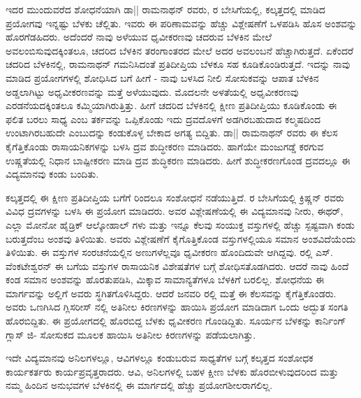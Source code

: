 ಇದರ ಮುಂದುವರೆದ ಶೋಧನೆಯಾಗಿ ಡಾ|| ರಾಮನಾಥನ್ ರವರು, ರ ಬೇಸಿಗೆಯಲ್ಲಿ, ಕಲ್ಕತ್ತದಲ್ಲಿ ಮಾಡಿದ ಪ್ರಯೋಗವು ಇನ್ನಷ್ಟು ಬೆಳಕು ಚೆಲ್ಲಿತು. ಇವರು ಈ ಪರಿಣಾಮವನ್ನು ಹೆಚ್ಚು ವಿಶ್ಲೇಷಣೆಗೆ ಒಳಪಡಿಸಿ ಹೊಸ ಅಂಶವನ್ನು ಹೊರಗೆಡಹಿದರು. ಅದೆಂದರೆ ನಾವು ಅಳೆಯುವ ಧೃವೀಕರಣವು ಚದರುವ ಬೆಳಕಿನ ಮೇಲೆ ಅವಲಂಬಿಸುವುದಕ್ಕಿಂತಲೂ, ಚದರಿದ ಬೆಳಕಿನ ತರಂಗಾಂತರದ ಮೇಲೆ ಅದರ ಅವಲಂಬನೆ ಹೆಚ್ಚಾಗಿರುತ್ತದೆ. ಏಕೆಂದರೆ ಚದರಿದ ಬೆಳಕಿನಲ್ಲಿ, ರಾಮನಾಥನ್ ಗಮನಿಸಿದಂತೆ ಪ್ರತಿದೀಪ್ತಿಯ ಬೆಳಕೂ ಸಹ ಕೂಡಿಕೊಂಡಿರುತ್ತದೆ. ಇದನ್ನು ನಾವು ಮಾಡಿದ ಪ್ರಯೋಗಗಳಲ್ಲಿ ಶೋಧಿಸಿದ ಬಗೆ ಹೀಗೆ - ನಾವು ಬಳಸಿದ ನೀಲಿ ಸೋಸುಕವನ್ನು ಆಪಾತ ಬೆಳಕಿನ ಅಡ್ಡಲಾಗಿಟ್ಟು ಅಧೃವೀಕರಣವನ್ನು ಮತ್ತೆ ಅಳೆಯುವುದು. ಮೊದಲನೇ ಅಳತೆಯಲ್ಲಿ ಅಧೃವೀಕರಣವು ಎರಡನೆಯದಕ್ಕಿಂತಲೂ ಕಮ್ಮಿಯಾಗಿರುತ್ತಿತ್ತು. ಹೀಗೆ ಚದರಿದ ಬೆಳಕಿನಲ್ಲಿ ಕ್ಷೀಣ ಪ್ರತಿದೀಪ್ತಿಯು ಕೂಡಿಕೊಂಡು ಈ ಫಲಿತ ಬರಲು ಸಾಧ್ಯ ಎಂಬ ತರ್ಕವನ್ನು ಒಪ್ಪಿಕೊಂಡು ಇದು ದ್ರವದೊಳಗೆ ಅಡಗಿರಬಹುದಾದ ಕಲ್ಮಷದಿಂದ ಉಂಟಾಗಿರಬಹುದೇ ಎಂಬುದನ್ನು ಕಂಡುಕೊಳ್ಳ ಬೇಕಾದ ಅಗತ್ಯ ಬಿದ್ದಿತು. ಡಾ|| ರಾಮನಾಥನ್ ರವರು ಈ ಕೆಲಸ ಕೈಗೆತ್ತಿಕೊಂಡು ರಾಸಾಯನಿಕಗಳನ್ನು ಬಳಸಿ ದ್ರವ ಶುದ್ಧೀಕರಣ ಮಾಡಿದರು. ಹಾಗೆಯೇ ಮಂಜುಗಡ್ಡೆ ಕರಗುವ ಉಷ್ಣತೆಯಲ್ಲಿ ನಿಧಾನ ಬಾಷ್ಪೀಕರಣ ಮಾಡಿ ದ್ರವ ಶುದ್ಧಿಕರಣ ಮಾಡಿದರು. ಹೀಗೆ ಶುದ್ಧೀಕರಣಗೊಂಡ ದ್ರವದಲ್ಲೂ ಈ ವಿದ್ಯಮಾನವು ಕಂಡು ಬಂದಿತು.

ಕಲ್ಕತ್ತದಲ್ಲಿ ಈ ಕ್ಷೀಣ ಪ್ರತಿದೀಪ್ತಿಯ ಬಗೆಗೆ  ರಿಂದಲೂ ಸಂಶೋಧನೆ ನಡೆಯುತ್ತಿದೆ. ರ ಬೇಸಿಗೆಯಲ್ಲಿ ಕ್ರಿಷ್ಣನ್ ರವರು  ವಿವಿಧ ದ್ರವಗಳನ್ನು ಬಳಸಿ ಈ ಪ್ರಯೋಗ ಮಾಡಿದರು. ಅವರ ವಿಶ್ಲೇಷಣೆಯಲ್ಲಿ ಈ ವಿದ್ಯಮಾನವು ನೀರು, ಈಥರ್, ಎಲ್ಲಾ ಮೋನೋ ಹೈಡ್ರಿಕ್ ಆಲ್ಕೋಹಾಲ್ ಗಳು ಮತ್ತು ಇನ್ನೂ ಕೆಲವು ಸಂಯುಕ್ತ ವಸ್ತುಗಳಲ್ಲಿ ಹೆಚ್ಚು ಸ್ಪಷ್ಟವಾಗಿ ಕಂಡು ಬರುತ್ತದೆಂಬ ಅಂಶವು ತಿಳಿಯಿತು. ಅವರು ವಿಶ್ಲೇಷಣೆಗೆ ಕೈಗೊತ್ತಿಕೊಂಡ ವಸ್ತುಗಳಲ್ಲಿಯೂ ಸಮಾನ ಅಂಶವಿದೆಯೆಂದು ತಿಳಿಯಿತು. ಈ ವಸ್ತುಗಳ ಸಂರಚನೆಯಲ್ಲಿನ ಅಣುಗಳೆಲ್ಲವೂ ಧೃವೀಕರಣ ಹೊಂದಿದುವೇ ಆಗಿದ್ದವು. ರಲ್ಲಿ ಎಸ್. ವೆಂಕಟೇಶ್ವರನ್ ಈ ಬಗೆಯ ವಸ್ತುಗಳ ರಾಸಾಯನಿಕ ವಿಶೇಷತೆಗಳ ಬಗ್ಗೆ ಶೋಧಿಸತೊಡಗಿದರು. ಆದರೆ ನಾವು ಹಿಂದೆ ಕಂಡ ಸಮಾನ ಅಂಶವನ್ನು ಹೊರತುಪಡಿಸಿ, ಮಿಕ್ಕಾವ ಸಾಮಾನ್ಯತೆಗಳೂ ಬೆಳಕಿಗೆ ಬರಲಿಲ್ಲ. ಶೋಧನೆಯ ಈ ಮಾರ್ಗವನ್ನು ಅಲ್ಲಿಗೆ ಅವರು ಸ್ಥಗಿತಗೊಳಿಸಿದ್ದರು. ಆದರೆ ಜನವರಿ ರಲ್ಲಿ ಮತ್ತೆ ಈ ಕೆಲಸವನ್ನು ಕೈಗೆತ್ತಿಕೊಂಡರು. ಅವರು ಒಣಗಿಸಿದ ಗ್ಲಿಸರೀಸ್ ನಲ್ಲಿ ಅತಿನೀಲ ಕಿರಣಗಳನ್ನು ಹಾಯಿಸಿ ಪ್ರಯೋಗ ಮಾಡಿದಾಗ ಒಂದು ಅದ್ಭುತ ಸಂಗತಿ ಹೊರಬಿದ್ದಿತು. ಈ ಪ್ರಯೋಗದಲ್ಲಿ ಹೊರಬಿದ್ದ ಬೆಳಕು ಧೃವೀಕರಣ ಗೊಂಡಿದ್ದಿತು. ಸೂರ್ಯನ ಬೆಳಕನ್ನು ಕಾರ್ನಿಂಗ್ ಗ್ಲಾಸ್ ಜಿ- ಸೋಸುಕದ ಮೂಲಕ ಹಾಯಿಸಿ ಅತಿನೀಲ ಕಿರಣಗಳನ್ನು ಪಡೆಯಲಾಗಿತ್ತು.

ಇದೇ ವಿದ್ಯಮಾನವು ಅನಿಲಗಳಲ್ಲೂ, ಆವಿಗಳಲ್ಲೂ ಕಂಡುಬರುವ ಸಾಧ್ಯತೆಗಳ ಬಗ್ಗೆ ಕಲ್ಕತ್ತದ ಸಂಶೋಧಕ ಕಾರ್ಯಕರ್ತರು ಕಾರ್ಯಪ್ರವೃತ್ತರಾದರು. ಆವಿ, ಅನಿಲಗಳಲ್ಲಿ ಬಹಳ ಕ್ಷೀಣ ಬೆಳಕು ಹೊರಬೀಳುವುದರಿಂದ ಮತ್ತು ನಮ್ಮ ಹಿಂದಿನ ಅನುಭವಗಳ ಬೆಳಕಿನಲ್ಲಿ ಈ ಮಾರ್ಗದಲ್ಲಿ ಹೆಚ್ಚು ಪ್ರಯೋಗಶೀಲರಾಗಲಿಲ್ಲ.



